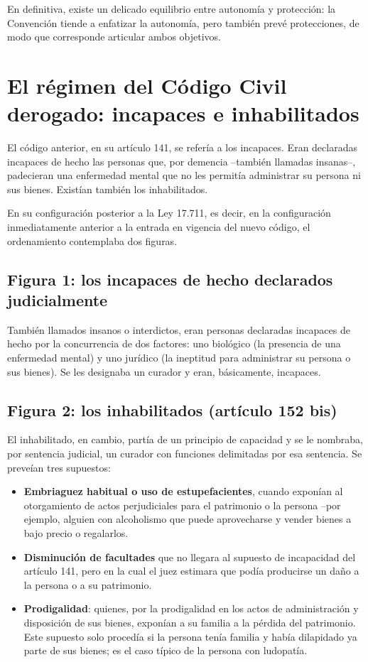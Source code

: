 \documentclass[12pt,oneside]{book}
\begin{document}
En definitiva, existe un delicado equilibrio entre autonomía y protección: la Convención tiende a enfatizar la autonomía, pero también prevé protecciones, de modo que corresponde articular ambos objetivos.

\section{El régimen del Código Civil derogado: incapaces e inhabilitados}

El código anterior, en su artículo 141, se refería a los incapaces. Eran declaradas incapaces de hecho las personas que, por demencia --también llamadas insanas--, padecieran una enfermedad mental que no les permitía administrar su persona ni sus bienes. Existían también los inhabilitados.

En su configuración posterior a la Ley 17.711, es decir, en la configuración inmediatamente anterior a la entrada en vigencia del nuevo código, el ordenamiento contemplaba dos figuras.

\subsection{Figura 1: los incapaces de hecho declarados judicialmente}

También llamados insanos o interdictos, eran personas declaradas incapaces de hecho por la concurrencia de dos factores: uno biológico (la presencia de una enfermedad mental) y uno jurídico (la ineptitud para administrar su persona o sus bienes). Se les designaba un curador y eran, básicamente, incapaces.

\subsection{Figura 2: los inhabilitados (artículo 152 bis)}

El inhabilitado, en cambio, partía de un principio de capacidad y se le nombraba, por sentencia judicial, un curador con funciones delimitadas por esa sentencia. Se preveían tres supuestos:

\begin{itemize}
\item \textbf{Embriaguez habitual o uso de estupefacientes}, cuando exponían al otorgamiento de actos perjudiciales para el patrimonio o la persona --por ejemplo, alguien con alcoholismo que puede aprovecharse y vender bienes a bajo precio o regalarlos.
\item \textbf{Disminución de facultades} que no llegara al supuesto de incapacidad del artículo 141, pero en la cual el juez estimara que podía producirse un daño a la persona o a su patrimonio.
\item \textbf{Prodigalidad}: quienes, por la prodigalidad en los actos de administración y disposición de sus bienes, exponían a su familia a la pérdida del patrimonio. Este supuesto solo procedía si la persona tenía familia y había dilapidado ya parte de sus bienes; es el caso típico de la persona con ludopatía.
\end{itemize}
\end{document}
